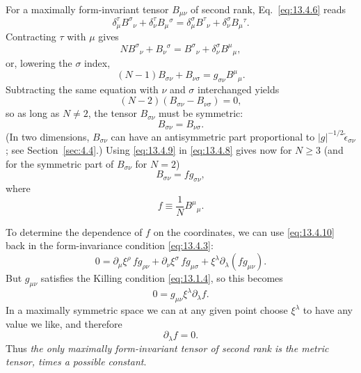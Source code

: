 For a maximally form-invariant tensor \(B_{\mu\nu}\) of second rank,
Eq.~\eqref{eq:13.4.6} reads
\[
  \delta_\mu^\tau B^\sigma{}_\nu
  +\delta_\nu^\tau B_\mu{}^\sigma
  =
  \delta_\mu^\sigma B^\tau{}_\nu
  +\delta_\nu^\sigma B_\mu{}^\tau.
\]
Contracting \(\tau\) with \(\mu\) gives
\[
  NB^\sigma{}_\nu+B_\nu{}^\sigma
  =
  B^\sigma{}_\nu+\delta_\nu^\sigma B^\mu{}_\mu,
\]
or, lowering the \(\sigma\) index,
\begin{equation}
  (N-1)B_{\sigma\nu}+B_{\nu\sigma}
  =
  g_{\sigma\nu}B^\mu{}_\mu.
  \tag{13.4.8}\label{eq:13.4.8}
\end{equation}
Subtracting the same equation with \(\nu\) and \(\sigma\) interchanged
yields
\[
  (N-2)\left(B_{\sigma\nu}-B_{\nu\sigma}\right)=0,
\]
so as long as \(N\neq2\), the tensor \(B_{\sigma\nu}\) must be symmetric:
\begin{equation}
  B_{\sigma\nu}=B_{\nu\sigma}.
  \tag{13.4.9}\label{eq:13.4.9}
\end{equation}
(In two dimensions, \(B_{\sigma\nu}\) can have an antisymmetric part
proportional to \(\lvert g\rvert^{-1/2}\tilde\epsilon_{\sigma\nu}\); see
Section~\ref{sec:4.4}.) Using \eqref{eq:13.4.9} in
\eqref{eq:13.4.8} gives now for \(N\geq3\) (and for the symmetric part of
\(B_{\sigma\nu}\) for \(N=2\))
\begin{equation}
  B_{\sigma\nu}=f g_{\sigma\nu},
  \tag{13.4.10}\label{eq:13.4.10}
\end{equation}
where
\[
  f\equiv\frac1N B^\mu{}_\mu.
\]

To determine the dependence of \(f\) on the coordinates, we can use
\eqref{eq:13.4.10} back in the form-invariance condition
\eqref{eq:13.4.3}:
\[
  0
  =
  \partial_\mu\xi^\rho\,f g_{\rho\nu}
  +\partial_\nu\xi^\sigma\,f g_{\mu\sigma}
  +\xi^\lambda\partial_\lambda(fg_{\mu\nu}).
\]
But \(g_{\mu\nu}\) satisfies the Killing condition \eqref{eq:13.1.4}, so
this becomes
\[
  0=g_{\mu\nu}\xi^\lambda\partial_\lambda f.
\]
In a maximally symmetric space we can at any given point choose
\(\xi^\lambda\) to have any value we like, and therefore
\begin{equation}
  \partial_\lambda f=0.
  \tag{13.4.11}\label{eq:13.4.11}
\end{equation}
Thus \emph{the only maximally form-invariant tensor of second rank is the
metric tensor, times a possible constant}.
